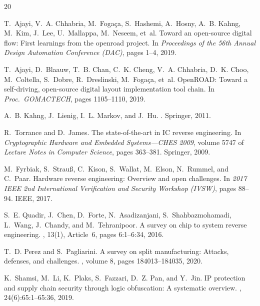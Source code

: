 \documentclass[11pt]{article}
\begin{document}

\begin{thebibliography}{20}

T.~Ajayi, V.~A. Chhabria, M.~Foga{\c{c}}a, S.~Hashemi, A.~Hosny,
A.~B. Kahng, M.~Kim, J.~Lee, U.~Mallappa, M.~Neseem, et~al.
\newblock Toward an open-source digital flow: First learnings from the
  openroad project.
\newblock In {\em Proceedings of the 56th Annual Design Automation
  Conference (DAC)}, pages 1--4, 2019.

T.~Ajayi, D.~Blaauw, T.~B. Chan, C.~K. Cheng, V.~A. Chhabria, D.~K. Choo,
M.~Coltella, S.~Dobre, R.~Dreslinski, M.~Foga{\c{c}}a, et~al.
\newblock OpenROAD: Toward a self-driving, open-source digital layout
  implementation tool chain.
\newblock In {\em Proc.\ GOMACTECH}, pages 1105--1110, 2019.

A.~B. Kahng, J.~Lienig, I.~L. Markov, and J.~Hu.
.
\newblock Springer, 2011.

R.~Torrance and D.~James.
\newblock The state-of-the-art in IC reverse engineering.
\newblock In {\em Cryptographic Hardware and Embedded Systems---CHES 2009},
  volume 5747 of {\em Lecture Notes in Computer Science}, pages 363--381.
  Springer, 2009.

M.~Fyrbiak, S.~Strau{\ss}, C.~Kison, S.~Wallat, M.~Elson, N.~Rummel, and
  C.~Paar.
\newblock Hardware reverse engineering: Overview and open challenges.
\newblock In {\em 2017 IEEE 2nd International Verification and Security
  Workshop (IVSW)}, pages 88--94. IEEE, 2017.

S.~E. Quadir, J.~Chen, D.~Forte, N.~Asadizanjani, S.~Shahbazmohamadi,
  L.~Wang, J.~Chandy, and M.~Tehranipoor.
\newblock A survey on chip to system reverse engineering.
,
  13(1), Article~6, pages 6:1--6:34, 2016.

T.~D. Perez and S.~Pagliarini.
\newblock A survey on split manufacturing: Attacks, defenses, and
  challenges.
, volume 8, pages 184013--184035, 2020.

K.~Shamsi, M.~Li, K.~Plaks, S.~Fazzari, D.~Z. Pan, and Y.~Jin.
\newblock IP protection and supply chain security through logic
  obfuscation: A systematic overview.
, 24(6):65:1--65:36, 2019.


\end{thebibliography}
\end{document}
